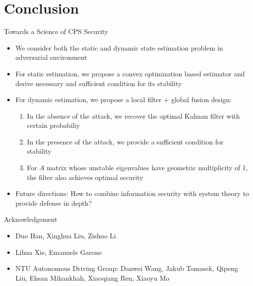 \documentclass[10pt]{beamer}
\begin{document}
\section{Conclusion}

\begin{frame}{Towards a Science of CPS Security}
  \begin{itemize}
    \item We consider both the static and dynamic state estimation problem in adversarial environment 
    \item For static estimation, we propose a convex optimization based estimator and derive necessary and sufficient condition for its stability
    \item For dynamic estimation, we propose a local filter + global fusion design:
      \begin{enumerate}
	\item In the absence of the attack, we recover the optimal Kalman filter with certain probabiliy
	\item In the presence of the attack, we provide a sufficient condition for stability
	\item For $A$ matrix whose unstable eigenvalues have geometric multiplicity of 1, the filter also achieves optimal security 
      \end{enumerate}
    \item Future directions: How to combine information security with system theory to provide defense in depth?
  \end{itemize}
\end{frame}

\begin{frame}{Acknowledgement}
  \begin{itemize}
    \item Duo Han, Xinghua Liu, Zishuo Li
    \item Lihua Xie, Emanuele Garone 
    \item NTU Autonomous Driving Group: Danwei Wang, Jakub Tomasek, Qipeng Liu, Ehsan Mihankhah, Xiaoqiang Ren, Xiaoyu Mo 
  \end{itemize}
\end{frame}
\end{document}
